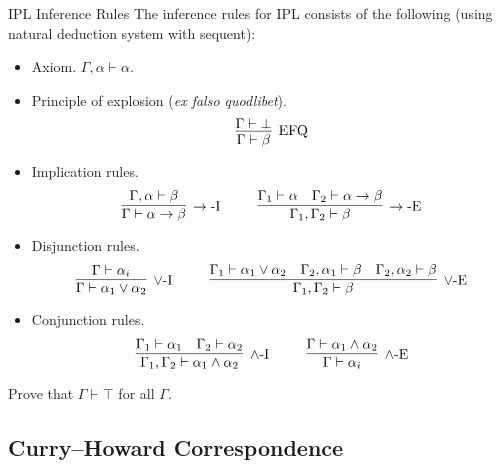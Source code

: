 \begin{frame}[allowframebreaks]{IPL Inference Rules}
    The inference rules for IPL consists of the following (using natural deduction system with sequent):
    \begin{itemize}
        \item Axiom. $\Gamma, \alpha \vdash \alpha$.
        \item Principle of explosion (\textit{ex falso quodlibet}).
        \[
        \infer[\mbox{EFQ}]{\Gamma \vdash \beta}{\Gamma \vdash \bot}
        \]
        \item Implication rules.
        \[
        \infer[\rightarrow\mbox{-I}]{\Gamma \vdash \alpha \rightarrow \beta}{\Gamma, \alpha \vdash \beta}
        ~~~~ ~~~~
        \infer[\rightarrow\mbox{-E}]{\Gamma_1, \Gamma_2 \vdash \beta}{\Gamma_1 \vdash \alpha & \Gamma_2 \vdash \alpha \rightarrow \beta}
        \]
        \item Disjunction rules.
        \[
        \infer[\vee\mbox{-I}]{\Gamma\vdash \alpha_1 \vee \alpha_2}{\Gamma \vdash \alpha_i}
        ~~~~ ~~~~
        \infer[\vee\mbox{-E}]{\Gamma_1, \Gamma_2 \vdash \beta}{
            \Gamma_1 \vdash \alpha_1 \vee \alpha_2
            &
            \Gamma_2, \alpha_1 \vdash \beta
            &
            \Gamma_2, \alpha_2 \vdash \beta
        }
        \]
        \item Conjunction rules.
        \[
        \infer[\wedge\mbox{-I}]{\Gamma_1, \Gamma_2 \vdash \alpha_1 \wedge \alpha_2}{
            \Gamma_1 \vdash \alpha_1
            &
            \Gamma_2 \vdash \alpha_2
        }
        ~~~~ ~~~~
        \infer[\wedge\mbox{-E}]{\Gamma \vdash \alpha_i}{
            \Gamma \vdash \alpha_1 \wedge \alpha_2
        }
        \]
    \end{itemize}
    
    \begin{example}
    Prove that $\Gamma \vdash \top$ for all $\Gamma$.
    \end{example}
\end{frame}

\subsection{Curry--Howard Correspondence}

